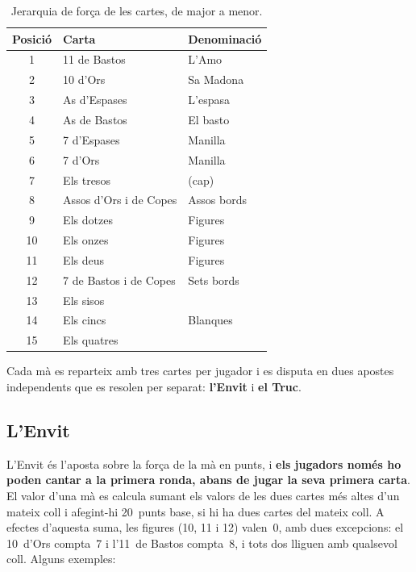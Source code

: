 \begin{table}[H]
  \centering
  \begin{tabular}{cll}
    \toprule
    Posició & Carta & Denominació \\
    \midrule
    1  & 11 de Bastos              & L'Amo \\
    2  & 10 d'Ors                  & Sa Madona \\
    3  & As d'Espases              & L'espasa \\
    4  & As de Bastos              & El basto \\
    5  & 7 d'Espases               & Manilla \\
    6  & 7 d'Ors                   & Manilla \\
    7  & Els tresos                & (cap) \\
    8  & Assos d'Ors i de Copes    & Assos bords \\
    9  & Els dotzes                & Figures \\
    10 & Els onzes                 & Figures \\
    11 & Els deus                  & Figures \\
    12 & 7 de Bastos i de Copes    & Sets bords \\
    13 & Els sisos                 & \multirow{3}{*}{Blanques} \\
    14 & Els cincs                 & \\
    15 & Els quatres               & \\
    \bottomrule
  \end{tabular}
  \caption{Jerarquia de força de les cartes, de major a menor.}
  \label{tab:jerarquia}
\end{table}

Cada mà es reparteix amb tres cartes per jugador i es disputa en dues apostes
independents que es resolen per separat: \textbf{l'Envit} i \textbf{el Truc}.

\subsection*{L'Envit}

L'Envit és l'aposta sobre la força de la mà en punts, i \textbf{els jugadors només ho poden
cantar a la primera ronda, abans de jugar la seva primera carta}. El valor d'una mà es
calcula sumant els valors de les dues cartes més altes d'un mateix coll i
afegint-hi 20~punts base, si hi ha dues cartes del mateix coll. A efectes d'aquesta suma, les figures (10, 11 i 12)
valen~0, amb dues excepcions: el 10~d'Ors compta~7 i l'11~de Bastos compta~8,
i tots dos lliguen amb qualsevol coll. Alguns exemples:

